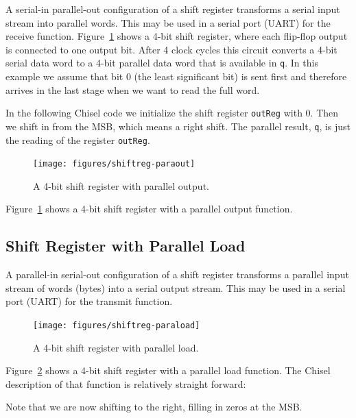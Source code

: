 \documentclass[%
    10pt,
    headinclude, footexclude,
    openright, %
    notitlepage,
    cleardoubleempty,
    headsepline,
    pointlessnumbers,
    bibtotoc, idxtotoc,
    ]{scrbook}
\newcommand{\code}[1]{{\lstinline[basicstyle=\small\ttfamily]{#1}}}
\begin{document}
A serial-in parallel-out configuration of a shift register transforms a serial input stream into parallel
words. This may be used in a serial port (UART) for the receive function.
Figure~\ref{fig:shiftreg-paraout} shows a 4-bit shift register, where each flip-flop output
is connected to one output bit. After 4 clock cycles this circuit converts a 4-bit serial data word
to a 4-bit parallel data word that is available in \code{q}. In this example we assume that bit 0
(the least significant bit) is sent first and therefore arrives in the last stage when we want to read
the full word.

In the following Chisel code we initialize the shift register \code{outReg} with 0. Then we shift in from the
MSB, which means a right shift. The parallel result, \code{q}, is just the reading of the register
\code{outReg}.


\begin{figure}
  \centering
  \texttt{[image: figures/shiftreg-paraout]}
  \caption{A 4-bit shift register with parallel output.}
  \label{fig:shiftreg-paraout}
\end{figure}

\noindent Figure~\ref{fig:shiftreg-paraout} shows a 4-bit shift register with a parallel output function.

\subsection{Shift Register with Parallel Load}

A parallel-in serial-out configuration of a shift register transforms a parallel input stream of words (bytes)
into a serial output stream.
This may be used in a serial port (UART) for the transmit function.

\begin{figure}
  \centering
  \texttt{[image: figures/shiftreg-paraload]}
  \caption{A 4-bit shift register with parallel load.}
  \label{fig:shiftreg-paraload}
\end{figure}

Figure~\ref{fig:shiftreg-paraload} shows a 4-bit shift register with a parallel load function.
The Chisel description of that function is relatively straight forward:


Note that we are now shifting to the right, filling in zeros at the MSB.
\end{document}

